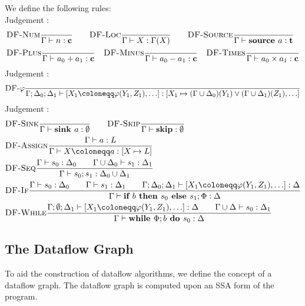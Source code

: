 We define the following rules:\\
Judgement :
\begin{align*}
    &\rule{DF-Num}{}{\typestep{\Gamma}{n}{\lclean}}\qquad
    \rule{DF-Loc}{}{\typestep{\Gamma}{X}{\Gamma(X)}}\qquad%
    \rule{DF-Source}{}{\typestep{\Gamma}{\source{a}}{\ltracked}}\\
    &\rule{DF-Plus}{}{\typestep{\Gamma}{a_0+a_1}{\lclean}}\quad
    \rule{DF-Minus}{}{\typestep{\Gamma}{a_0-a_1}{\lclean}}\quad
    \rule{DF-Times}{}{\typestep{\Gamma}{a_0 \times a_1}{\lclean}}
\end{align*}
Judgement :
\begin{align*}
    &\rule{DF-$\varphi$}{}{\typestep{\Gamma;\Delta_0;\Delta_1}{\defaultphilist}
    {[X_1 \mapsto (\Gamma \union \Delta_0)(Y_1) \join (\Gamma \union \Delta_1)(Z_1), \ldots]}}\\
\end{align*}
Judgement :
\begin{align*}
    &\rule{DF-Sink}{}{\typestep{\Gamma}{\sink{a}}{\emptyset}}\qquad
    \rule{DF-Skip}{}{\typestep{\Gamma}{\skipcmd}{\emptyset}}\\
    &\rule{DF-Assign}{\typestep{\Gamma}{a}{L}}{\typestep{\Gamma}{\defaultstore}{[X \mapsto L]}}\\%
    &\rule{DF-Seq}{\typestep{\Gamma}{s_0}{\Delta_0}\qquad
    \typestep{\Gamma \cup \Delta_0}{s_1}{\Delta_1}}{\typestep{\Gamma}{\defaultssaseq}{\Delta_0 \cup \Delta_1}}\\
    &\rule{DF-If}{\typestep{\Gamma}{s_0}{\Delta_0}\qquad \typestep{\Gamma}{s_1}{\Delta_1}\qquad
    \typestep{\Gamma;\Delta_0;\Delta_1}{\defaultphilist}{\Delta}}
    {\typestep{\Gamma}{\defaultssaif}{\Delta}}\\
    &\rule{DF-While}{\typestep{\Gamma;\emptyset;\Delta_1}{\defaultphilist}{\Delta}\qquad
    \typestep{\Gamma \cup \Delta}{s_0}{\Delta_1}}
    {\typestep{\Gamma}{\defaultssawhile}{\Delta}}
\end{align*}

\iffalse

\subsection{The Dataflow Graph}
To aid the construction of dataflow algorithms, we define the concept
of a dataflow graph.
The dataflow graph is computed upon an SSA form of the program.

